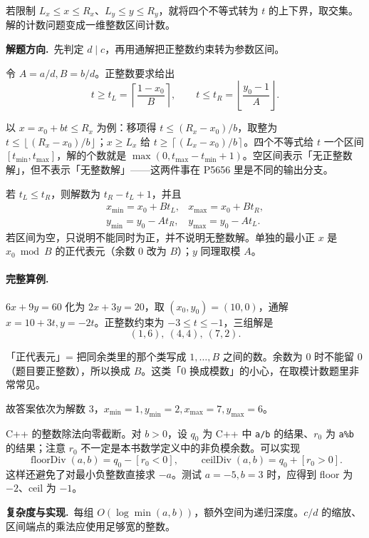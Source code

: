 \documentclass[UTF8,a4paper,11pt,twoside,openright,fontset=fandol]{ctexbook}
\theoremstyle{definition}
\newcommand{\floor}[1]{\left\lfloor #1\right\rfloor}
\newcommand{\ceil}[1]{\left\lceil #1\right\rceil}
\newcommand{\iva}[1]{\left[#1\right]}
\newcommand{\hint}{\par\noindent\textbf{解题方向.}\ }
\newcommand{\cost}{\par\noindent\textbf{复杂度与实现.}\ }
\begin{document}
若限制 $L_x\le x\le R_x$、$L_y\le y\le R_y$，就将四个不等式转为 $t$ 的上下界，取交集。解的计数问题变成一维整数区间计数。

\hint 先判定 $d\mid c$，再用通解把正整数约束转为参数区间。

令 $A=a/d,B=b/d$。正整数要求给出
\[
 t\ge t_L=\ceil{\frac{1-x_0}{B}},\qquad
 t\le t_R=\floor{\frac{y_0-1}{A}}.
\]

\begin{tip}
以 $x=x_0+bt\le R_x$ 为例：移项得 $t\le(R_x-x_0)/b$，取整为 $t\le\floor{(R_x-x_0)/b}$；$x\ge L_x$ 给 $t\ge\ceil{(L_x-x_0)/b}$。四个不等式给 $t$ 一个区间 $[t_{\min},t_{\max}]$，解的个数就是 $\max(0,t_{\max}-t_{\min}+1)$。空区间表示「无正整数解」，但不表示「无整数解」——这两件事在 P5656 里是不同的输出分支。
\end{tip}

若 $t_L\le t_R$，则解数为 $t_R-t_L+1$，并且
\[
\begin{array}{ll}
x_{\min}=x_0+Bt_L,&x_{\max}=x_0+Bt_R,\\
y_{\min}=y_0-At_R,&y_{\max}=y_0-At_L.
\end{array}
\]
若区间为空，只说明不能同时为正，并不说明无整数解。单独的最小正 $x$ 是 $x_0\bmod B$ 的正代表元（余数 $0$ 改为 $B$）；$y$ 同理取模 $A$。

\paragraph{完整算例.} $6x+9y=60$ 化为 $2x+3y=20$，取 $(x_0,y_0)=(10,0)$，通解 $x=10+3t,y=-2t$。正整数约束为 $-3\le t\le-1$，三组解是
\[
 (1,6),\ (4,4),\ (7,2).
\]

\begin{tip}[词义：正代表元]
「正代表元」= 把同余类里的那个类写成 $1,\ldots,B$ 之间的数。余数为 $0$ 时不能留 $0$（题目要正整数），所以换成 $B$。这类「$0$ 换成模数」的小心，在取模计数题里非常常见。
\end{tip}

故答案依次为解数 $3$，$x_{\min}=1,y_{\min}=2,x_{\max}=7,y_{\max}=6$。

\begin{pitfall}[负数整除不等于向下取整]
C++ 的整数除法向零截断。对 $b>0$，设 $q_0$ 为 C++ 中 \texttt{a/b} 的结果、$r_0$ 为 \texttt{a\%b} 的结果；注意 $r_0$ 不一定是本书数学定义中的非负模余数。可以实现
\[
\operatorname{floorDiv}(a,b)=q_0-\iva{r_0<0},\qquad
\operatorname{ceilDiv}(a,b)=q_0+\iva{r_0>0}.
\]
这样还避免了对最小负整数直接求 $-a$。测试 $a=-5,b=3$ 时，应得到 floor 为 $-2$、ceil 为 $-1$。
\end{pitfall}
\cost 每组 $O(\log\min(a,b))$，额外空间为递归深度。$c/d$ 的缩放、区间端点的乘法应使用足够宽的整数。
\end{document}
